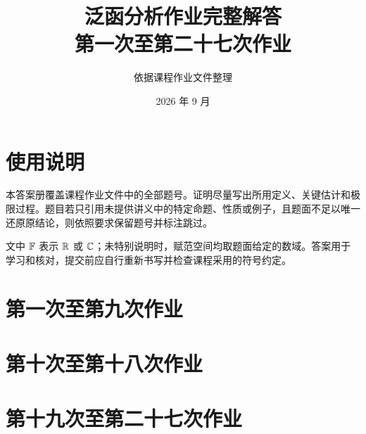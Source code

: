 \documentclass[UTF8,openany,11pt]{ctexbook}
\title{泛函分析作业完整解答\\\large 第一次至第二十七次作业}
\author{依据课程作业文件整理}
\date{2026 年 9 月}
\begin{document}
\frontmatter
\maketitle
\chapter*{使用说明}
本答案册覆盖课程作业文件中的全部题号。证明尽量写出所用定义、关键估计和极限过程。题目若只引用未提供讲义中的特定命题、性质或例子，且题面不足以唯一还原原结论，则依照要求保留题号并标注跳过。

文中 $\mathbb F$ 表示 $\mathbb R$ 或 $\mathbb C$；未特别说明时，赋范空间均取题面给定的数域。答案用于学习和核对，提交前应自行重新书写并检查课程采用的符号约定。
\tableofcontents
\mainmatter
\chapter{第一次至第九次作业}

\chapter{第十次至第十八次作业}

\chapter{第十九次至第二十七次作业}

\end{document}
